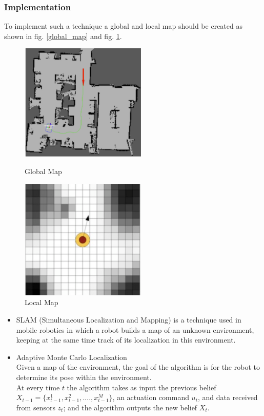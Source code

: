 \subsubsection*{Implementation}
To implement such a technique a global and local map should be created as shown in fig. \ref{global_map} and fig. \ref{local_map}.
\begin{figure}[!htbp]
	\centering
	\begin{minipage}{.5\textwidth}
		\centering
		\includegraphics[width = 6cm]{Pictures/global}%
		\caption{Global Map}
		\label{global_map}
	\end{minipage}%
	\begin{minipage}{.5\textwidth}
		\centering
		\includegraphics[width = 6cm]{Pictures/local}%
		\caption{Local Map}
		\label{local_map}
	\end{minipage}
\end{figure}
\begin{itemize}
\item SLAM (Simultaneous Localization and Mapping) is a technique used in mobile robotics in which a robot builds a map of an unknown environment, keeping at the same time track of its localization in this environment.\\
\end{itemize}
\begin{itemize}
\item Adaptive Monte Carlo Localization
\\
Given a map of the environment, the goal of the algorithm is for the robot to determine its pose within the environment.
\\
At every time \(t\) the algorithm takes as input the previous belief \(X_{t-1}=\big\{x_{t-1}^1, x_{t-1}^2, ...., x_{t-1}^M\big\} \),  an actuation command \(u_t\), and data received from sensors \(z_t\); and the algorithm outputs the new belief \(X_t\).
\end{itemize}
